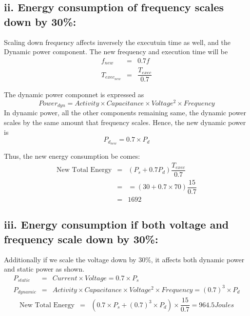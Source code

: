 \documentclass{tufte-handout}
\begin{document}
	\subsection{ii. Energy consumption of frequency scales down by 30\%:}
		Scaling down frequency affects inversely the executuin time as well, and the Dynamic power component.
		The new frequency and execution time will be
		\begin{eqnarray*}
			f_{new} &=& 0.7 f \\
			T_{exec_{new}} &=& \dfrac{T_{exec}}{0.7} 
		\end{eqnarray*}

		The dynamic power componnet is expressed as 
		\[
			Power_{dyn} = Activity \times Capacitance \times Voltage^2 \times Frequency
		\]
		In dynamic power, all the other components remaining same, the dynamic power scales by the same amount that frequency scales.
		Hence, the new dynamic power is
		\[
			P_{d_{new}} = 0.7 \times P_d
		\]

		Thus, the new energy consumption be comes:
		\begin{eqnarray*}
			\mbox{New Total Energy} &=& (P_s + 0.7 P_d) \dfrac{T_{exec}}{0.7} \\
			&=& = (30 + 0.7 \times 70) \dfrac{15}{0.7} \\
			&=& 1692
		\end{eqnarray*}


	\subsection{iii. Energy consumption if both voltage and frequency scale down by 30\%:}
	Additionally if we scale the voltage down by $30\%$, it affects both dynamic power and static power as shown.  
	\begin{eqnarray*}
		P_{static} &=& Current \times Voltage = 0.7 \times P_s \\
		P_{dynamic} &=& Activity \times Capacitance \times Voltage^2 \times Frequency = (0.7)^3 \times P_d
	\end{eqnarray*}
	\begin{eqnarray*}
		\mbox{New Total Energy} &=& ( 0.7 \times P_s + (0.7)^3 \times P_d) \times \dfrac{15}{0.7} = 964.5 Joules
	\end{eqnarray*}

\newpage
\end{document}
